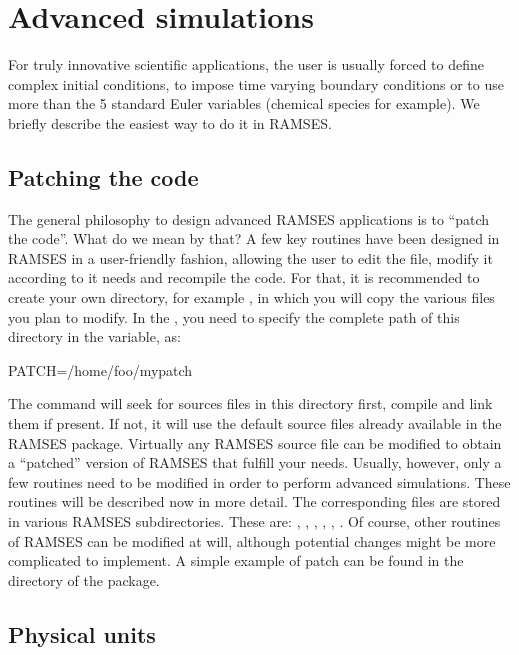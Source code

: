 \clearpage
\section{Advanced simulations}

For truly innovative scientific applications, the user is usually forced to
define complex initial conditions, to impose time varying boundary conditions
or to use more than the 5 standard Euler variables (chemical species for
example).  We briefly describe the easiest way to do it in RAMSES.

\subsection{Patching the code}

The general philosophy to design advanced RAMSES applications is to ``patch the
code''. What do we mean by that? A few key routines have been designed in
RAMSES in a user-friendly fashion, allowing the user to edit the file,
modify it according to it needs and recompile the code. For that, it is
recommended to create your own directory, for example , in which
you will copy the various files you plan to modify. In the , you
need to specify the complete path of this directory in the 
variable, as:
%
\begin{Prompt}
PATCH=/home/foo/mypatch  
\end{Prompt}
%
The  command will seek for sources files in this directory first,
compile and link them if present. If not, it will use the default source
files already available in the RAMSES package. Virtually any RAMSES source file
can be modified to obtain a ``patched'' version of RAMSES that fulfill your
needs. Usually, however, only a few routines need to be modified in order to
perform advanced simulations.  These routines will be described now in more
detail. The corresponding files are stored in various RAMSES subdirectories.
These are: , ,
, ,
, . Of course, other
routines of RAMSES can be modified at will, although potential changes might be
more complicated to implement. A simple example of patch can be found in the
directory  of the package. 

\subsection{Physical units}

